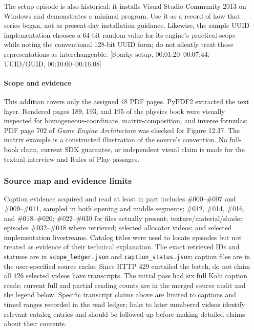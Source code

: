 The setup episode is also historical: it installs Visual Studio Community 2013 on Windows and demonstrates a minimal program. Use it as a record of how that series began, not as present-day installation guidance. Likewise, the sample UUID implementation chooses a 64-bit random value for its engine's practical scope while noting the conventional 128-bit UUID form; do not silently treat those representations as interchangeable. {[}Sparky setup, 00:01:20--00:07:44; UUID/GUID, 00:10:00--00:16:08{]}

\paragraph{Scope and evidence}\label{06-engine-ii-ch042-scope-and-evidence}

\hypertarget{06-engine-ii-ch042-scope-and-evidence}{}

This addition covers only the assigned 48 PDF pages. PyPDF2 extracted the text layer. Rendered pages 189, 193, and 195 of the physics book were visually inspected for homogeneous-coordinate, matrix-composition, and inverse formulas; PDF page 702 of \emph{Game Engine Architecture} was checked for Figure 12.37. The matrix example is a constructed illustration of the source's convention. No full-book claim, current SDK guarantee, or independent visual claim is made for the textual interview and Rules of Play passages.

\subsubsection{Source map and evidence limits}\label{06-engine-ii-ch042-source-map-and-evidence-limits}

\hypertarget{06-engine-ii-ch042-source-map-and-evidence-limits}{}

Caption evidence acquired and read at least in part includes \#000--\#007 and \#009--\#011, sampled in both opening and middle segments; \#012, \#014, \#016, and \#018--\#020; \#022--\#030 for files actually present; texture/material/shader episodes \#032--\#048 where retrieved; selected allocator videos; and selected implementation livestreams. Catalog titles were used to locate episodes but not treated as evidence of their technical explanation. The exact retrieved IDs and statuses are in \texttt{scope\_ledger.json} and \texttt{caption\_status.json}; caption files are in the user-specified source cache. Since HTTP 429 curtailed the batch, do not claim all 426 selected videos have transcripts. The initial pass had six full Kohi caption reads; current full and partial reading counts are in the merged source audit and the legend below. Specific transcript claims above are limited to captions and timed ranges recorded in the read ledger; links to later numbered videos identify relevant catalog entries and should be followed up before making detailed claims about their contents.


